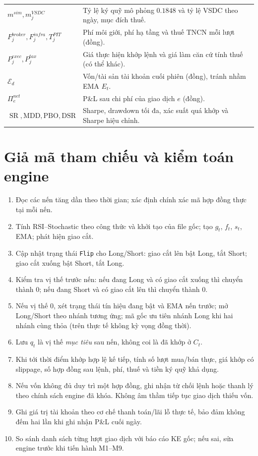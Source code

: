 \documentclass[12pt,a4paper,oneside]{article}
\newcommand{\SR}{\operatorname{SR}}
\begin{document}
\begin{longtable}{p{3.5cm}p{10.8cm}}
$m^{sim},m_j^{VSDC}$ & Tỷ lệ ký quỹ mô phỏng $0.1848$ và tỷ lệ VSDC theo ngày, mục đích thuế.\\
$F_j^{broker},F_j^{infra},T_j^{PIT}$ & Phí môi giới, phí hạ tầng và thuế TNCN mỗi lượt (đồng).\\
$P_j^{exec},P_j^{tax}$ & Giá thực hiện khớp lệnh và giá làm căn cứ tính thuế (có thể khác).\\
$\mathcal E_d$ & Vốn/tài sản tài khoản cuối phiên (đồng), tránh nhầm EMA $E_t$.\\
$\Pi_e^{net}$ & P\&L sau chi phí của giao dịch $e$ (đồng).\\
$\SR,\mathrm{MDD},\mathrm{PBO},\mathrm{DSR}$ & Sharpe, drawdown tối đa, xác suất quá khớp và Sharpe hiệu chỉnh.\\
\bottomrule
\end{longtable}
\normalsize

\section{Giả mã tham chiếu và kiểm toán engine}\label{app:pseudo}
\begin{enumerate}
\item Đọc các nến tăng dần theo thời gian; xác định chính xác mã hợp đồng thực tại mỗi nến.
\item Tính RSI--Stochastic theo công thức và khởi tạo của file gốc; tạo $g_t$, $f_t$, $s_t$, EMA; phát hiện giao cắt.
\item Cập nhật trạng thái \texttt{Flip} cho Long/Short: giao cắt lên bật Long, tắt Short; giao cắt xuống bật Short, tắt Long.
\item Kiểm tra vị thế trước nến: nếu đang Long và có giao cắt xuống thì chuyển thành 0; nếu đang Short và có giao cắt lên thì chuyển thành 0.
\item Nếu vị thế 0, xét trạng thái tín hiệu đang bật và EMA nến trước; mở Long/Short theo nhánh tương ứng; mã gốc ưu tiên nhánh Long khi hai nhánh cùng thỏa (trên thực tế không kỳ vọng đồng thời).
\item Lưu $q_t$ là vị thế \emph{mục tiêu} sau nến, không coi là đã khớp ở $C_t$.
\item Khi tới thời điểm khớp hợp lệ kế tiếp, tính số lượt mua/bán thực, giá khớp có slippage, số hợp đồng sau lệnh, phí, thuế và tiền ký quỹ khả dụng.
\item Nếu vốn không đủ duy trì một hợp đồng, ghi nhận từ chối lệnh hoặc thanh lý theo chính sách engine đã khóa. Không âm thầm tiếp tục giao dịch thiếu vốn.
\item Ghi giá trị tài khoản theo cơ chế thanh toán/lãi lỗ thực tế, bảo đảm không đếm hai lần khi ghi nhận P\&L cuối ngày.
\item So sánh danh sách từng lượt giao dịch với báo cáo KE gốc; nếu sai, sửa engine trước khi tiến hành M1--M9.
\end{enumerate}
\end{document}
